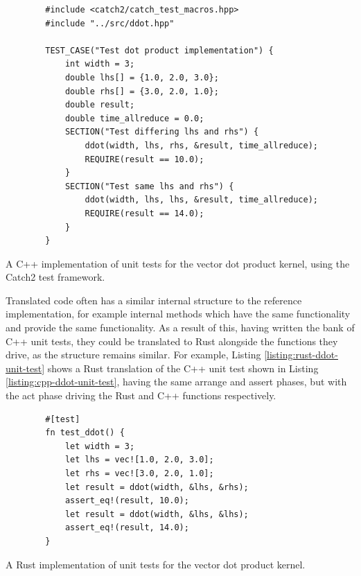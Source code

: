 \begin{code}
    \begin{verbatim}
        #include <catch2/catch_test_macros.hpp>
        #include "../src/ddot.hpp"
        
        TEST_CASE("Test dot product implementation") {
            int width = 3;
            double lhs[] = {1.0, 2.0, 3.0};
            double rhs[] = {3.0, 2.0, 1.0};
            double result;
            double time_allreduce = 0.0;
            SECTION("Test differing lhs and rhs") {
                ddot(width, lhs, rhs, &result, time_allreduce);
                REQUIRE(result == 10.0);
            }
            SECTION("Test same lhs and rhs") {
                ddot(width, lhs, lhs, &result, time_allreduce);
                REQUIRE(result == 14.0);
            }
        }
    \end{verbatim}
    \caption{A C++ implementation of unit tests for the vector dot product kernel, using the Catch2 test framework.}
    \label{listing:cpp-ddot-unit-test}
\end{code}

Translated code often has a similar internal structure to the reference implementation, for example internal methods which have the same functionality and provide the same functionality. As a result of this, having written the bank of C++ unit tests, they could be translated to Rust alongside the functions they drive, as the structure remains similar. For example, Listing \ref{listing:rust-ddot-unit-test} shows a Rust translation of the C++ unit test shown in Listing \ref{listing:cpp-ddot-unit-test}, having the same arrange and assert phases, but with the act phase driving the Rust and C++ functions respectively.

\begin{code}[H]
    \begin{verbatim}
        #[test]
        fn test_ddot() {
            let width = 3;
            let lhs = vec![1.0, 2.0, 3.0];
            let rhs = vec![3.0, 2.0, 1.0];
            let result = ddot(width, &lhs, &rhs);
            assert_eq!(result, 10.0);
            let result = ddot(width, &lhs, &lhs);
            assert_eq!(result, 14.0);
        }
    \end{verbatim}
    \caption{A Rust implementation of unit tests for the vector dot product kernel.}
    \label{listing:rust-ddot-unit-test}
\end{code}

